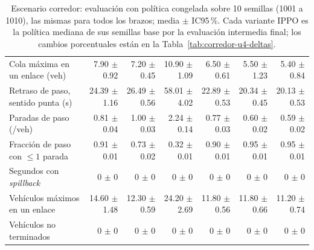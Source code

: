 \begin{table}[H]
\begin{tabular}{p{2.8cm}rrrrrr}
Cola máxima en un enlace (veh) & 7.90 $\pm$ 0.92 & 7.20 $\pm$ 0.45 & 10.90 $\pm$ 1.09 & 6.50 $\pm$ 0.61 & 5.50 $\pm$ 1.23 & 5.40 $\pm$ 0.84 \\
Retraso de paso, sentido punta (s) & 24.39 $\pm$ 1.16 & 26.49 $\pm$ 0.56 & 58.01 $\pm$ 4.02 & 22.89 $\pm$ 0.53 & 20.34 $\pm$ 0.45 & 20.13 $\pm$ 0.53 \\
Paradas de paso (/veh) & 0.81 $\pm$ 0.04 & 1.00 $\pm$ 0.03 & 2.24 $\pm$ 0.14 & 0.77 $\pm$ 0.03 & 0.60 $\pm$ 0.02 & 0.59 $\pm$ 0.02 \\
Fracción de paso con $\le 1$ parada & 0.91 $\pm$ 0.01 & 0.73 $\pm$ 0.02 & 0.32 $\pm$ 0.01 & 0.90 $\pm$ 0.01 & 0.95 $\pm$ 0.01 & 0.95 $\pm$ 0.01 \\
Segundos con \textit{spillback} & 0 $\pm$ 0 & 0 $\pm$ 0 & 0 $\pm$ 0 & 0 $\pm$ 0 & 0 $\pm$ 0 & 0 $\pm$ 0 \\
Vehículos máximos en un enlace & 14.60 $\pm$ 1.48 & 12.30 $\pm$ 0.59 & 24.20 $\pm$ 2.69 & 11.80 $\pm$ 0.56 & 11.80 $\pm$ 0.66 & 11.20 $\pm$ 0.74 \\
Vehículos no terminados & 0 $\pm$ 0 & 0 $\pm$ 0 & 0 $\pm$ 0 & 0 $\pm$ 0 & 0 $\pm$ 0 & 0 $\pm$ 0 \\
\bottomrule
\end{tabular}
\caption[Escenario corredor: evaluación de las variantes IPPO]{Escenario corredor: evaluación con política congelada sobre 10 semillas (1001 a 1010), las mismas para todos los brazos; media $\pm$ IC95\,\%. Cada variante IPPO es la política mediana de sus semillas base por la evaluación intermedia final; los cambios porcentuales están en la Tabla~\ref{tab:corredor-u4-deltas}.}
\label{tab:corredor-u4}
\end{table}
